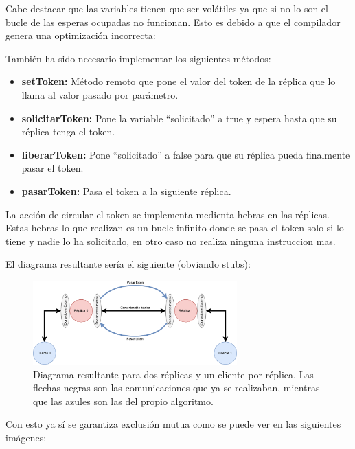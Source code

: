 \documentclass{article}
\begin{document}
Cabe destacar que las variables tienen que ser volátiles ya que si no lo son el bucle de las esperas ocupadas no funcionan. Esto es debido a que el compilador genera una optimización incorrecta:



También ha sido necesario implementar los siguientes métodos:

\begin{itemize}
    \item \textbf{setToken: }Método remoto que pone el valor del token de la réplica que lo llama al valor pasado por parámetro.
    \item \textbf{solicitarToken: }Pone la variable ``solicitado'' a true y espera hasta que su réplica tenga el token.
    \item \textbf{liberarToken: }Pone ``solicitado'' a false para que su réplica pueda finalmente pasar el token.
    \item \textbf{pasarToken: }Pasa el token a la siguiente réplica.
\end{itemize}

La acción de circular el token se implementa medienta hebras en las réplicas. Estas hebras lo que realizan es un bucle infinito donde se pasa el token solo si lo tiene y nadie lo ha solicitado, en otro caso no realiza ninguna instruccion mas.

El diagrama resultante sería el siguiente (obviando stubs):

\begin{figure}[H]
    \centering
    \includegraphics[width=0.7\textwidth]{imagenes/diagramaAnillo.png}
    \caption{Diagrama resultante para dos réplicas y un cliente por réplica. Las flechas negras son las comunicaciones que ya se realizaban, mientras que las azules son las del propio algoritmo.}
\end{figure}

Con esto ya sí se garantiza exclusión mutua como se puede ver en las siguientes imágenes:

\end{document}
